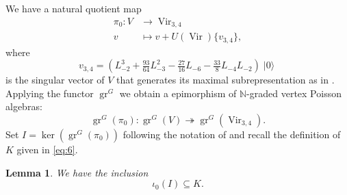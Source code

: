 \documentclass[a4paper, 12pt, reqno]{amsart}
\newtheorem{lemma}[theorem]{Lemma}
\theoremstyle{remark}
\DeclareMathOperator{\Vir}{Vir}
\DeclareMathOperator{\gr}{gr}
\DeclareMathOperator{\vac}{|0\rangle}
\begin{document}
We have a natural quotient map
\begin{align*}
  \pi_0: V &\to \Vir_{3, 4} \\
  v &\mapsto v + U(\Vir)\{v_{3, 4}\},
\end{align*}
where
\begin{equation*}
  v_{3, 4} = (L_{-2}^3 + \tfrac{93}{64}L_{-3}^2 - \tfrac{27}{16}L_{-6} - \tfrac{33}{8}L_{-4}L_{-2})\vac
\end{equation*}
is the singular vector of $V$ that generates its maximal subrepresentation as in \cite{andrews_singular_2022}.
Applying the functor $\gr^G$ we obtain a epimorphism of $\mathbb{N}$-graded vertex Poisson algebras:
\begin{equation*}
  \gr^G(\pi_0): \gr^G(V) \twoheadrightarrow \gr^G(\Vir_{3, 4}).
\end{equation*}
Set $I = \ker(\gr^G(\pi_0))$ following the notation of \cite{andrews_singular_2022} and recall the definition of $K$ given in \eqref{eq:6}.

\begin{lemma}
  \label{lmm:9}
  We have the inclusion
  \begin{equation*}
    \iota_0(I) \subseteq K.
  \end{equation*}
\end{lemma}
\end{document}
